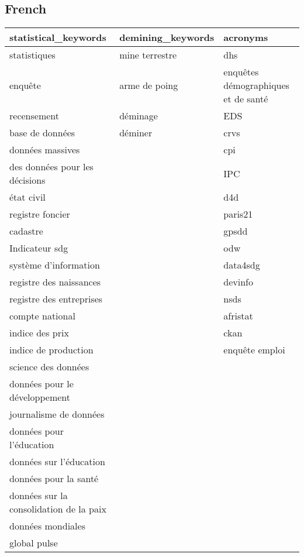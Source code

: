\documentclass[
]{article}
\begin{document}
\hypertarget{french}{%
\subsection*{French}\label{french}}

\begin{table}[H]
\centering\begingroup\fontsize{10}{12}\selectfont

\begin{tabular}{l|l|l}
\hline
statistical\_keywords & demining\_keywords & acronyms\\
\hline
statistiques & mine terrestre & dhs\\
\hline
enquête & arme de poing & enquêtes démographiques et de santé\\
\hline
recensement & déminage & EDS\\
\hline
base de données & déminer & crvs\\
\hline
données massives &  & cpi\\
\hline
des données pour les décisions &  & IPC\\
\hline
état civil &  & d4d\\
\hline
registre foncier &  & paris21\\
\hline
cadastre &  & gpsdd\\
\hline
Indicateur sdg &  & odw\\
\hline
système d'information &  & data4sdg\\
\hline
registre des naissances &  & devinfo\\
\hline
registre des entreprises &  & nsds\\
\hline
compte national &  & afristat\\
\hline
indice des prix &  & ckan\\
\hline
indice de production &  & enquête emploi\\
\hline
science des données &  & \\
\hline
données pour le développement &  & \\
\hline
journalisme de données &  & \\
\hline
données pour l'éducation &  & \\
\hline
données sur l'éducation &  & \\
\hline
données pour la santé &  & \\
\hline
données sur la consolidation de la paix &  & \\
\hline
données mondiales &  & \\
\hline
global pulse &  & \\

\end{tabular}
\end{table}
\end{document}
